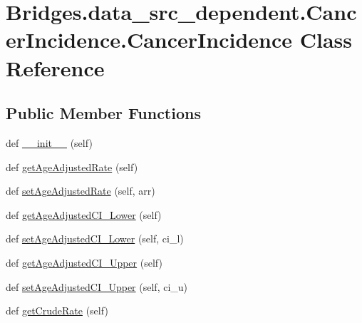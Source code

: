 \hypertarget{class_bridges_1_1data__src__dependent_1_1_cancer_incidence_1_1_cancer_incidence}{}\section{Bridges.\+data\+\_\+src\+\_\+dependent.\+Cancer\+Incidence.\+Cancer\+Incidence Class Reference}
\label{class_bridges_1_1data__src__dependent_1_1_cancer_incidence_1_1_cancer_incidence}
\subsection*{Public Member Functions}
\begin{DoxyCompactItemize}
\item 
def \hyperlink{class_bridges_1_1data__src__dependent_1_1_cancer_incidence_1_1_cancer_incidence_a7d5bae063e4329ffbab287d7a602c29b}{\+\_\+\+\_\+init\+\_\+\+\_\+} (self)
\item 
def \hyperlink{class_bridges_1_1data__src__dependent_1_1_cancer_incidence_1_1_cancer_incidence_a86703c6df5893d6e0d23c01138a566c9}{get\+Age\+Adjusted\+Rate} (self)
\item 
def \hyperlink{class_bridges_1_1data__src__dependent_1_1_cancer_incidence_1_1_cancer_incidence_a0f58876048ee14456029d9a9732c396b}{set\+Age\+Adjusted\+Rate} (self, arr)
\item 
def \hyperlink{class_bridges_1_1data__src__dependent_1_1_cancer_incidence_1_1_cancer_incidence_aaa7bd0ab1d13df8cdd1a61164235fc3b}{get\+Age\+Adjusted\+C\+I\+\_\+\+Lower} (self)
\item 
def \hyperlink{class_bridges_1_1data__src__dependent_1_1_cancer_incidence_1_1_cancer_incidence_acc480adf1a4b5ee3276b6213a1a6adef}{set\+Age\+Adjusted\+C\+I\+\_\+\+Lower} (self, ci\+\_\+l)
\item 
def \hyperlink{class_bridges_1_1data__src__dependent_1_1_cancer_incidence_1_1_cancer_incidence_af98be5c915a435e095059d4e00857ae7}{get\+Age\+Adjusted\+C\+I\+\_\+\+Upper} (self)
\item 
def \hyperlink{class_bridges_1_1data__src__dependent_1_1_cancer_incidence_1_1_cancer_incidence_a92e9032d38b61822f5919944d73832d3}{set\+Age\+Adjusted\+C\+I\+\_\+\+Upper} (self, ci\+\_\+u)
\item 
def \hyperlink{class_bridges_1_1data__src__dependent_1_1_cancer_incidence_1_1_cancer_incidence_aa4ae73abe96068c485ea6b014cf47cd4}{get\+Crude\+Rate} (self)

\end{DoxyCompactItemize}
